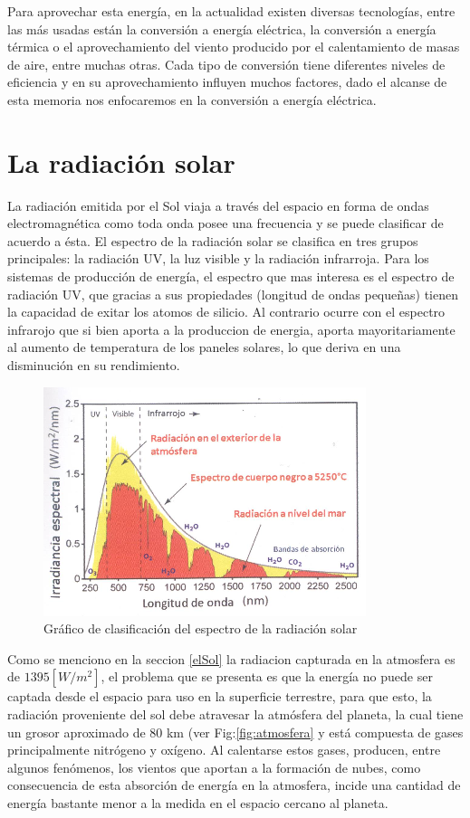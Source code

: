 Para aprovechar esta energía, en la actualidad existen diversas tecnologías, entre las más usadas están la conversión a energía eléctrica, la conversión a energía térmica o el aprovechamiento del viento producido por el calentamiento de masas de aire, entre muchas otras. Cada tipo de conversión tiene diferentes niveles de eficiencia y en su aprovechamiento influyen muchos factores, dado el alcanse de esta memoria nos enfocaremos en la conversión a energía eléctrica.\\

\section{La radiación solar}
La radiación emitida por el Sol viaja a través del espacio en forma de ondas electromagnética como toda onda posee una frecuencia y se puede clasificar de acuerdo a ésta. El espectro de la radiación solar se clasifica en tres grupos principales: la radiación UV, la luz visible y la radiación infrarroja. Para los sistemas de producción de energía, el espectro que mas interesa es el espectro de radiación UV, que gracias a sus propiedades (longitud de ondas pequeñas) tienen la capacidad de exitar los atomos de silicio. Al contrario ocurre con el espectro infrarojo que si bien aporta a la produccion de energia, aporta mayoritariamente al aumento de temperatura de los paneles solares, lo que deriva en una disminución en su rendimiento.

\begin{figure}[h!]
        \centering
        \includegraphics[scale=0.9]{images/espectroSolar}
        \caption{Gráfico de clasificación del espectro de la radiación solar\cite{recursoSolar:1}}
\end{figure}

Como se menciono en la seccion \ref{elSol} la radiacion capturada en la atmosfera es de $1395 [W/m^{2}]$, el problema que se presenta es que la energía no puede ser captada desde el espacio para uso en la superficie terrestre, para que esto, la radiación proveniente del sol debe atravesar la atmósfera del planeta, la cual tiene un grosor aproximado de 80 km (ver Fig:\ref{fig:atmosfera} y está compuesta de gases principalmente nitrógeno y oxígeno\cite{recursoSolar:1}. Al calentarse estos gases, producen, entre algunos fenómenos, los vientos que aportan a la formación de nubes, como consecuencia de esta absorción de energía en la atmosfera, incide una cantidad de energía bastante menor a la medida en el espacio cercano al planeta.

